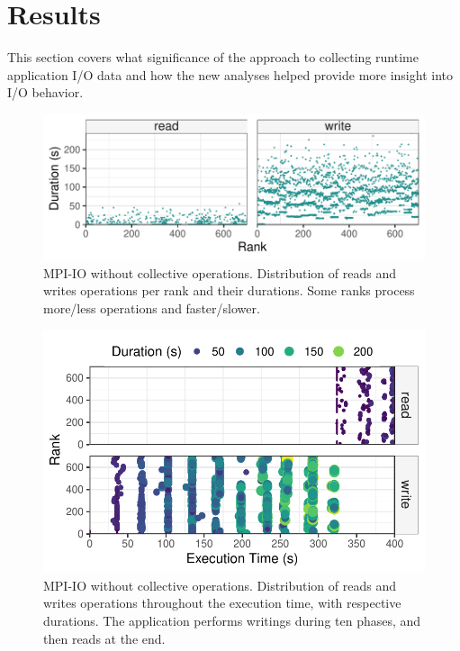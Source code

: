 \section{Results}


This section covers what significance of the approach to collecting runtime application I/O data and how the new analyses helped provide more insight into I/O behavior.

 


\begin{figure}
	\centering
        \includegraphics[width=\linewidth]{figs/255653_mpi_io_luster_no_coll_duration_nocolor.pdf}
	\caption{MPI-IO without collective operations. Distribution of reads and writes operations per rank
          and their durations. Some ranks process more/less operations
          and faster/slower.}
	\label{f:mpi_io}
\end{figure}

\begin{figure}
	\centering
	\includegraphics[width=\linewidth]{figs/255653_mpi_io_luster_no_coll_execution2.pdf}
	\caption{MPI-IO without collective operations. Distribution of reads and writes operations
          throughout the execution time, with respective
          durations. The application performs writings during ten
          phases, and then reads at the end.}
	\label{f:mpi_io}
\end{figure}

